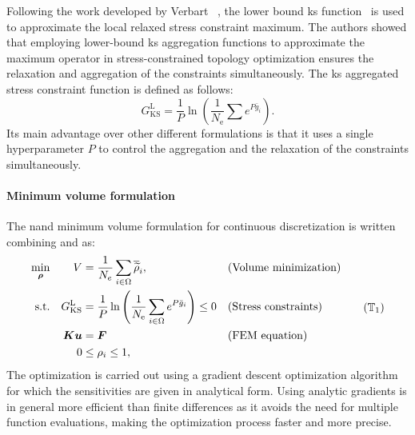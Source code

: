 Following the work developed by Verbart \etal~, the lower bound \gls{ks} function~ is used to approximate the local relaxed stress constraint maximum. The authors showed that employing lower-bound \gls{ks} aggregation functions to approximate the maximum operator in stress-constrained topology optimization ensures the relaxation and aggregation of the constraints simultaneously. The \gls{ks} aggregated stress constraint function is defined as follows:
\begin{equation} 
    G_{\text{KS}}^\text{L} = \frac{1}{P} \ln{\left( \frac{1}{N_\text{e}} \sum e^{{P}\bar{g}_i} \right)}.
    \label{eq:03_gksl}
\end{equation}
Its main advantage over other different formulations is that it uses a single hyperparameter $P$ to control the aggregation and the relaxation of the constraints simultaneously.

\paragraph{Minimum volume formulation}
The \gls{nand} minimum volume formulation for continuous discretization is written combining  and  as:
\begin{equation}
    \begin{aligned}
    \min_{\bm{\rho}}         && V &= \frac{1}{N_{e}} \sum_{i \in \Omega} \rhophys_i, && \text{(Volume minimization)} \\
    \textrm{s.t.}   && G_{\text{KS}}^\text{L} &= \frac{1}{P} \ln{\left( \frac{1}{N_\text{e}} \sum_{i \in \Omega} e^{{P}\bar{g}_i} \right)} \leq 0 && \textrm{(Stress constraints)}\\
    && \bm{K}\bm{u} &= \bm{F} && \textrm{(FEM equation)}\\
    && 0 &\leq \rho_i \leq 1, \\
    \end{aligned}
    \tag{$\mathbb{T}_1$}
    \label{eq:03_prob-stress}
\end{equation}
The optimization is carried out using a gradient descent optimization algorithm for which the sensitivities are given in analytical form. Using analytic gradients is in general more efficient than finite differences as it avoids the need for multiple function evaluations, making the optimization process faster and more precise.

